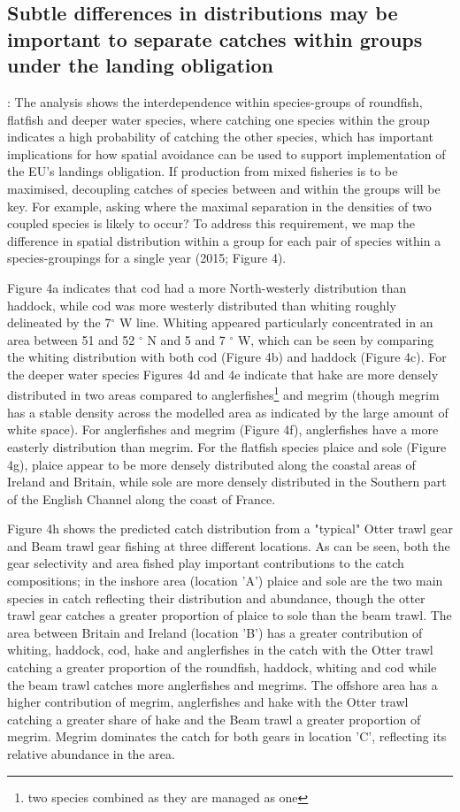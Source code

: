 \documentclass{nature}
\begin{document}
\begin{linenumbers}
\subsection{Subtle differences in distributions may be important to separate
	catches within groups under the landing obligation}: The analysis shows
the interdependence within species-groups of roundfish, flatfish and deeper
water species, where catching one species within the group indicates a high
probability of catching the other species, which has important implications for
how spatial avoidance can be used to support implementation of the EU's
landings obligation. If production from mixed fisheries is to be maximised,
decoupling catches of species between and within the groups will be key. For
example, asking where the maximal separation in the densities of two coupled
species is likely to occur? To address this requirement, we map the difference
in spatial distribution within a group for each pair of species within a
species-groupings for a single year (2015; Figure 4). 

Figure 4a indicates that cod had a more North-westerly distribution than
haddock, while cod was more westerly distributed than whiting roughly
delineated by the 7$^{\circ}$ W line. Whiting appeared particularly
concentrated in an area between 51 and 52 $^{\circ}$ N and 5 and 7 $^{\circ}$
W, which can be seen by comparing the whiting distribution with both cod
(Figure 4b) and haddock (Figure 4c). For the deeper water species Figures 4d
and 4e indicate that hake are more densely distributed in two areas compared to
anglerfishes\footnote{two species combined as they are managed as one} and
megrim (though megrim has a stable density across the modelled area as
indicated by the large amount of white space). For anglerfishes and megrim
(Figure 4f), anglerfishes have a more easterly distribution than megrim. For
the flatfish species plaice and sole (Figure 4g), plaice appear to be more
densely distributed along the coastal areas of Ireland and Britain, while sole
are more densely distributed in the Southern part of the English Channel along
the coast of France.

Figure 4h shows the predicted catch distribution from a "typical" Otter trawl
gear and Beam trawl gear fishing at three different locations. As can be seen,
both the gear selectivity and area fished play important contributions to the
catch compositions; in the inshore area (location 'A') plaice and sole are the
two main species in catch reflecting their distribution and abundance, though
the otter trawl gear catches a greater proportion of plaice to sole than the
beam trawl.  The area between Britain and Ireland (location 'B') has a greater
contribution of whiting, haddock, cod, hake and anglerfishes in the catch with
the Otter trawl catching a greater proportion of the roundfish, haddock,
whiting and cod while the beam trawl catches more anglerfishes and megrims. The
offshore area has a higher contribution of megrim, anglerfishes and hake with
the Otter trawl catching a greater share of hake and the Beam trawl a greater
proportion of megrim. Megrim dominates the catch for both gears in location
'C', reflecting its relative abundance in the area.  


\end{linenumbers}
\end{document}
